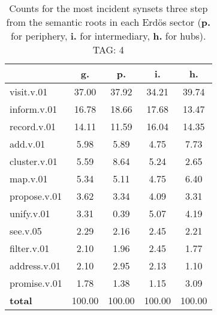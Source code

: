 \begin{table}[h!]
\begin{center}
\begin{tabular}{| l || c | c | c | c |}\hline
 & {\bf g.} & {\bf p.} & {\bf i.} & {\bf h.} \\\hline\hline
visit.v.01 & 37.00  & 37.92  & 34.21  & 39.74 \\\hline
inform.v.01 & 16.78  & 18.66  & 17.68  & 13.47 \\\hline
record.v.01 & 14.11  & 11.59  & 16.04  & 14.35 \\\hline
add.v.01 & 5.98  & 5.89  & 4.75  & 7.73 \\\hline
cluster.v.01 & 5.59  & 8.64  & 5.24  & 2.65 \\\hline
map.v.01 & 5.34  & 5.11  & 4.75  & 6.40 \\\hline
propose.v.01 & 3.62  & 3.34  & 4.09  & 3.31 \\\hline
unify.v.01 & 3.31  & 0.39  & 5.07  & 4.19 \\\hline
see.v.05 & 2.29  & 2.16  & 2.45  & 2.21 \\\hline
filter.v.01 & 2.10  & 1.96  & 2.45  & 1.77 \\\hline
address.v.01 & 2.10  & 2.95  & 2.13  & 1.10 \\\hline
promise.v.01 & 1.78  & 1.38  & 1.15  & 3.09 \\\hline\hline
{{\bf total}} & 100.00  & 100.00  & 100.00  & 100.00 \\\hline
\end{tabular}
\caption{Counts for the most incident synsets three step from the semantic roots in each Erd\"os sector ({\bf p.} for periphery, {\bf i.} for intermediary, {\bf h.} for hubs). TAG: 4}
\end{center}
\end{table}